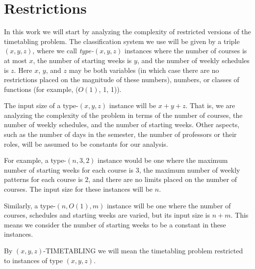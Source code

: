 \section{Restrictions}

In this work we will start by analyzing the complexity of restricted versions of the timetabling problem. The classification system we use will be given by a triple $(x, y, z)$, where we call \emph{type-}$(x, y, z)$ instances where the number of courses is at most $x$, the number of starting weeks is $y$, and the number of weekly schedules is $z$. Here $x$, $y$, and $z$ may be both variables (in which case there are no restrictions placed on the magnitude of these numbers), numbers, or classes of functions (for example, ($O(1)$, 1, 1)).

The input size of a type-$(x, y, z)$ instance will be $x + y + z$. That is, we are analyzing the complexity of the problem in terms of the number of courses, the number of weekly schedules, and the number of starting weeks. Other aspects, such as the number of days in the semester, the number of professors or their roles, will be assumed to be constants for our analysis.

For example, a type-$(n, 3, 2)$ instance would be one where the maximum number of starting weeks for each course is $3$, the maximum number of weekly patterns for each course is $2$, and there are no limits placed on the number of courses. The input size for these instances will be $n$.

Similarly, a type-$(n, O(1), m)$ instance will be one where the number of courses, schedules and starting weeks are varied, but its input size is $n + m$. This means we consider the number of starting weeks to be a constant in these instances.

By $(x, y, z)$-TIMETABLING we will mean the timetabling problem restricted to instances of type $(x, y, z)$.
